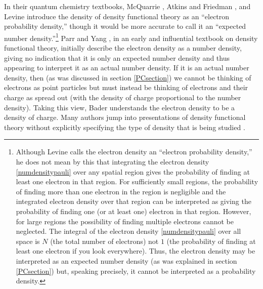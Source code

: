 \documentclass[onecolumn,secnumarabic,amsmath,amssymb,balancelastpage,nofootinbib]{article}
\begin{document}
In their quantum chemistry textbooks, McQuarrie \cite[pg.\ 649--650]{mcquarrieQC}, Atkins and Friedman \cite[pg.\ 317]{atkins2011}, and Levine \cite[sec.\ 16.5]{levineQC} introduce the density of density functional theory as an ``electron probability density,'' though it would be more accurate to call it an ``expected number density.''\footnote{Although Levine \cite[sec.\ 16.5]{levineQC}  calls the electron density an ``electron probability density,'' he does not mean by this that integrating the electron density \eqref{numdensitypauli} over any spatial region gives the probability of finding at least one electron in that region.  For sufficiently small regions, the probability of finding more than one electron in the region is negligible and the integrated electron density over that region can be interpreted as giving the probability of finding one (or at least one) electron in that region.  However, for large regions the possibility of finding multiple electrons cannot be neglected.  The integral of the electron density \eqref{numdensitypauli} over all space is $N$ (the total number of electrons) not $1$ (the probability of finding at least one electron if you look everywhere).  Thus, the electron density may be interpreted as an expected number density (as was explained in section \ref{PCsection}) but, speaking precisely, it cannot be interpreted as a probability density.}  Parr and Yang \cite[pg.\ 14]{parryang}, in an early and influential textbook on density functional theory, initially describe the electron density as a number density, giving no indication that it is only an expected number density and thus appearing to interpret it as an actual number density.  If it is an actual number density, then (as was discussed in section \ref{PCsection}) we cannot be thinking of electrons as point particles but must instead be thinking of electrons and their charge as spread out (with the density of charge proportional to the number density).  Taking this view, Bader \cite{bader2010} understands the electron density to be a density of charge.  Many authors jump into presentations of density functional theory without explicitly specifying the type of density that is being studied \cite{seminario1995, martin2004, engel2011, becke2014}.

\end{document}
